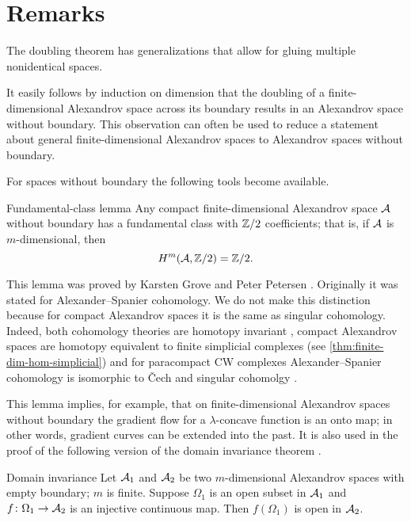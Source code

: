 \section{Remarks}\label{sec:bry-remarks}

The doubling theorem has generalizations \cite{petrunin1997,ge-li} that allow for gluing multiple nonidentical spaces.

It easily follows by induction on dimension  that the doubling of a finite-dimensional Alexandrov space across its boundary results in an Alexandrov space without boundary.
This observation can often be used to reduce a statement about general finite-dimensional Alexandrov spaces to  Alexandrov spaces without boundary.

For spaces without boundary the following tools become available.

\begin{thm}{Fundamental-class lemma}\label{lem:fund-class}
Any compact finite-dimensional Alexandrov space $\mathcal{A}$ without boundary has a fundamental class with $\mathbb{Z}/2$ coefficients;
that is, if $\mathcal{A}$ is $m$-dimensional, then
\[H^m(\mathcal{A},\mathbb{Z}/2)=\mathbb{Z}/2.\]

\end{thm}

This lemma was proved by Karsten Grove and Peter Petersen \cite{grove-petersen1993}.
Originally it was stated for Alexander--Spanier cohomology. We do not make this distinction  because for compact Alexandrov spaces it is the same as singular cohomology.
Indeed,  both cohomology theories are homotopy invariant \cite[Chapter 6]{Spanier}, compact Alexandrov spaces are homotopy equivalent to finite simplicial complexes (see \ref{thm:finite-dim-hom-simplicial}) and  for paracompact  CW complexes  Alexander--Spanier cohomology is isomorphic to \v{C}ech  and singular cohomolgy \cite[Chapter 6]{Spanier}.

This lemma implies, for example, that on finite-dimensional Alexandrov spaces without boundary 
the gradient flow for a $\lambda$-concave function is an onto map;
in other words, gradient curves can be extended into the past.
It is also used in the proof of the following version of the domain invariance theorem \cite[Theorem 3.2]{kapovitch-zhu}.

\begin{thm}{Domain invariance}\label{thm-inv-domain}
Let $\mathcal{A}_1$ and $\mathcal{A}_2$ be two $m$-dimensional Alexandrov spaces with empty boundary; $m$ is finite.
Suppose $\Omega_1$ is an open subset in $\mathcal{A}_1$ and $f\colon\Omega_1\to \mathcal{A}_2$ is an injective continuous map.
Then $f(\Omega_1)$ is open in $\mathcal{A}_2$.
\end{thm}

